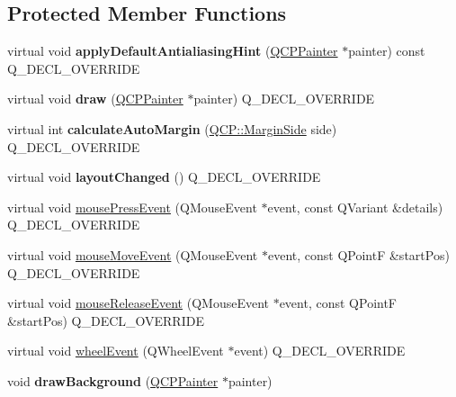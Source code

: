 \subsection*{Protected Member Functions}
\begin{DoxyCompactItemize}
\item 
virtual void {\bfseries apply\+Default\+Antialiasing\+Hint} (\hyperlink{class_q_c_p_painter}{Q\+C\+P\+Painter} $\ast$painter) const Q\+\_\+\+D\+E\+C\+L\+\_\+\+O\+V\+E\+R\+R\+I\+DE\hypertarget{class_q_c_p_axis_rect_a4a318008e2b7f881a14c3d97186b31f9}{}\label{class_q_c_p_axis_rect_a4a318008e2b7f881a14c3d97186b31f9}

\item 
virtual void {\bfseries draw} (\hyperlink{class_q_c_p_painter}{Q\+C\+P\+Painter} $\ast$painter) Q\+\_\+\+D\+E\+C\+L\+\_\+\+O\+V\+E\+R\+R\+I\+DE\hypertarget{class_q_c_p_axis_rect_af710c50530e370539a4439d6c4db9090}{}\label{class_q_c_p_axis_rect_af710c50530e370539a4439d6c4db9090}

\item 
virtual int {\bfseries calculate\+Auto\+Margin} (\hyperlink{namespace_q_c_p_a7e487e3e2ccb62ab7771065bab7cae54}{Q\+C\+P\+::\+Margin\+Side} side) Q\+\_\+\+D\+E\+C\+L\+\_\+\+O\+V\+E\+R\+R\+I\+DE\hypertarget{class_q_c_p_axis_rect_ac51055d83f5f414b6d013d3a24b0a941}{}\label{class_q_c_p_axis_rect_ac51055d83f5f414b6d013d3a24b0a941}

\item 
virtual void {\bfseries layout\+Changed} () Q\+\_\+\+D\+E\+C\+L\+\_\+\+O\+V\+E\+R\+R\+I\+DE\hypertarget{class_q_c_p_axis_rect_a575e38ac71a21906dc2d7b3364db2d62}{}\label{class_q_c_p_axis_rect_a575e38ac71a21906dc2d7b3364db2d62}

\item 
virtual void \hyperlink{class_q_c_p_axis_rect_aa9a7c807eaa4666870ac94aa6abc4dde}{mouse\+Press\+Event} (Q\+Mouse\+Event $\ast$event, const Q\+Variant \&details) Q\+\_\+\+D\+E\+C\+L\+\_\+\+O\+V\+E\+R\+R\+I\+DE
\item 
virtual void \hyperlink{class_q_c_p_axis_rect_a9cd27ad8c5cfb49aefd9dbb30def4beb}{mouse\+Move\+Event} (Q\+Mouse\+Event $\ast$event, const Q\+PointF \&start\+Pos) Q\+\_\+\+D\+E\+C\+L\+\_\+\+O\+V\+E\+R\+R\+I\+DE
\item 
virtual void \hyperlink{class_q_c_p_axis_rect_a6c89b988d3a0b93c0878f0ebdb5037f4}{mouse\+Release\+Event} (Q\+Mouse\+Event $\ast$event, const Q\+PointF \&start\+Pos) Q\+\_\+\+D\+E\+C\+L\+\_\+\+O\+V\+E\+R\+R\+I\+DE
\item 
virtual void \hyperlink{class_q_c_p_axis_rect_a93eeaa0c127d6d6fe8171b2455080262}{wheel\+Event} (Q\+Wheel\+Event $\ast$event) Q\+\_\+\+D\+E\+C\+L\+\_\+\+O\+V\+E\+R\+R\+I\+DE
\item 
void {\bfseries draw\+Background} (\hyperlink{class_q_c_p_painter}{Q\+C\+P\+Painter} $\ast$painter)\hypertarget{class_q_c_p_axis_rect_ab49d338d1ce74b476fcead5b32cf06dc}{}\label{class_q_c_p_axis_rect_ab49d338d1ce74b476fcead5b32cf06dc}


\end{DoxyCompactItemize}
